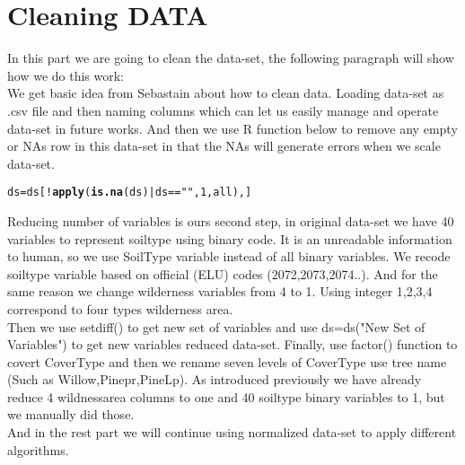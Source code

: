 \documentclass{article}\usepackage[]{graphicx}\usepackage[]{color}
\makeatletter
\newcommand{\hlnum}[1]{\textcolor[rgb]{0.686,0.059,0.569}{#1}}%
\newcommand{\hlstr}[1]{\textcolor[rgb]{0.192,0.494,0.8}{#1}}%
\newcommand{\hlopt}[1]{\textcolor[rgb]{0,0,0}{#1}}%
\newcommand{\hlstd}[1]{\textcolor[rgb]{0.345,0.345,0.345}{#1}}%
\newcommand{\hlkwb}[1]{\textcolor[rgb]{0.69,0.353,0.396}{#1}}%
\newcommand{\hlkwd}[1]{\textcolor[rgb]{0.737,0.353,0.396}{\textbf{#1}}}%
\newenvironment{kframe}{%
 \def\at@end@of@kframe{}%
 \ifinner\ifhmode%
  \def\at@end@of@kframe{\end{minipage}}%
  \begin{minipage}{\columnwidth}%
 \fi\fi%
 \def\FrameCommand##1{\hskip\@totalleftmargin \hskip-\fboxsep
 \colorbox{shadecolor}{##1}\hskip-\fboxsep
     \hskip-\linewidth \hskip-\@totalleftmargin \hskip\columnwidth}%
 \MakeFramed {\advance\hsize-\width
   \@totalleftmargin\z@ \linewidth\hsize
   \@setminipage}}%
 {\par\unskip\endMakeFramed%
 \at@end@of@kframe}
\newenvironment{knitrout}{}{} %
\makeatother
\begin{document}
	\section{Cleaning DATA}\cite{6}

	
	\noindent	In this part we are going to clean the data-set, the following paragraph will show how we do this work:\\
	\noindent	We get basic idea from Sebastain about how to clean data. Loading data-set as .csv file and then naming columns which can let us easily manage and operate data-set in future works.
	\noindent	And then we use R function below to remove any empty or NAs row in this data-set in that the NAs will generate errors when we scale data-set.\\
\begin{knitrout}
\color{fgcolor}\begin{kframe}
\begin{alltt}
\hlstd{ds} \hlkwb{=} \hlstd{ds[}\hlopt{!}\hlkwd{apply}\hlstd{(}\hlkwd{is.na}\hlstd{(ds)} \hlopt{|} \hlstd{ds} \hlopt{==} \hlstr{""}\hlstd{,} \hlnum{1}\hlstd{, all), ]}
\end{alltt}
\end{kframe}
\end{knitrout}
\noindent	Reducing number of variables is ours second step, in original data-set we have 40 variables to represent soiltype using binary code. It is an unreadable information to human, so we use SoilType variable instead of all binary variables.
We recode soiltype variable based on official (ELU) codes (2072,2073,2074..).
And for the same reason we change wilderness variables from 4 to 1. Using integer 1,2,3,4 correspond to four types wilderness area.\\
Then we use setdiff() to get new set of variables and use ds=ds("New Set of Variables") to get new variables reduced data-set. 
Finally, use factor() function to covert CoverType and then we rename seven levels of CoverType use tree name (Such as Willow,Pinepr,PineLp).
\noindent	As introduced previously we have already reduce 4 wildnessarea columns to one and 40 soiltype binary variables to 1, but we manually did those.\\
\noindent	And in the rest part we will continue using normalized data-set to apply different algorithms.
\end{document}
